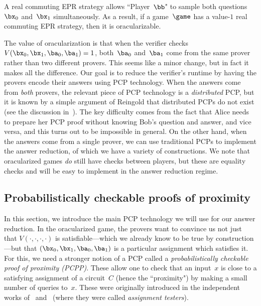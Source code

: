 \noindent
A real commuting EPR strategy allows ``Player~$\bb$" to sample both questions~$\bx_0$ and~$\bx_1$ simultaneously.
As a result, if a game~$\game$ has a value-$1$ real commuting EPR strategy, then it is oracularizable.

The value of oracularization is that when the verifier checks $V(\bx_0, \bx_1, \ba_0, \ba_1) = 1$,
both~$\ba_0$ and~$\ba_1$ come from the same prover rather than two different provers.
This seems like a minor change, but in fact it makes all the difference.
Our goal is to reduce the verifier's runtime by having the provers encode their answers using PCP technology.
When the answers come from \emph{both} provers,
the relevant piece of PCP technology is a \emph{distributed} PCP,
but it is known by a simple argument of Reingold that distributed PCPs do not exist
(see the discussion in~\cite{ARW17}).
The key difficulty comes from the fact that Alice needs to prepare her PCP proof without
knowing Bob's question and answer, and vice versa, and this turns out to be impossible in general.
On the other hand,
when the answers come from a single prover,
we can use traditional PCPs to implement the answer reduction, of which we have a variety of constructions.
We note that oracularized games \emph{do} still have checks between players,
but these are equality checks and will be easy to implement in the answer reduction regime.

\subsection{Probabilistically checkable proofs of proximity}

In this section, we introduce the main PCP technology we will use for our answer reduction.
In the oracularized game,
the provers want to convince us not just that $V(\cdot, \cdot, \cdot, \cdot)$
is satisfiable---which we already know to be true by construction---but that $(\bx_0, \bx_1, \ba_0, \ba_1)$
is a particular assignment which satisfies it.
For this, we need a stronger notion of a PCP called a \emph{probabilistically checkable proof of proximity (PCPP)}.
These allow one to check that an input~$x$ is close to a satisfying assignment of a circuit~$C$ (hence the ``proximity")
by making a small number of queries to~$x$.
These were originally introduced in the independent works of~\cite{BGH+06}
and~\cite{DR06} (where they were called \emph{assignment testers}).

